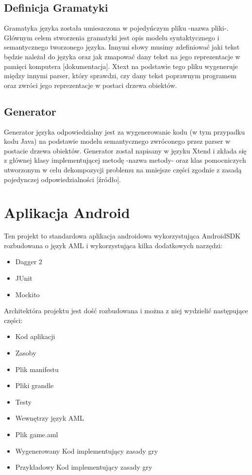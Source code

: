 \documentclass	{xmgr}
\begin{document}
\subsection{Definicja Gramatyki} 
Gramatyka języka została umieszczona w pojedyńczym pliku -nazwa pliki-. Głównym celem stworzenia gramatyki jest opis modelu syntaktycznego i semantycznego tworzonego języka. Innymi słowy musimy zdefiniować jaki tekst będzie należał do języka oraz jak zmapować dany tekst na jego reprezentacje w pamięci komputera [dokumentacja]. Xtext na podstawie tego pliku wygeneruje między innymi parser, który sprawdzi, czy dany tekst poprawnym programem oraz zwróci jego reprezentacje w postaci drzewa obiektów.

\subsection{Generator}
Generator języka odpowiedzialny jest za wygenerowanie kodu (w tym przypadku kodu Java) na podstawie modelu semantycznego zwróconego przez parser w postacie drzewa obiektów. Generator został napisany w języku Xtend i zkłada się z głównej klasy implementującej metodę -nazwa metody- oraz klas pomocniczych utworzonym w celu dekompozycji problemu na mniejsze części zgodnie z zasadą pojedynczej odpowiedzialności [źródło].

\section{Aplikacja Android}
Ten projekt to standardowa aplikacja androidowa wykorzystująca AndroidSDK rozbudowana o język AML i wykorzystująca kilka dodatkowych narzędzi:
\begin{itemize}
	\item Dagger 2
	\item JUnit
	\item Mockito
\end{itemize}

Architektóra projektu jest dość rozbudowana i można z niej wydzielić następujące części:

\begin{itemize}
	\item Kod aplikacji
	\item Zasoby
	\item Plik manifestu
	\item Pliki grandle
	\item Testy
	\item Wewnętrzy język AML
	\item Plik game.aml
	\item Wygenerowany Kod implementujący zasady gry
	\item Przykładowy Kod implementujący zasady gry
\end{itemize}
\end{document}
